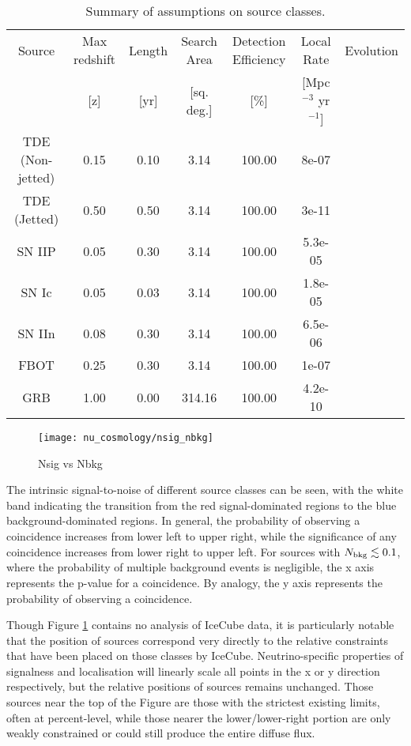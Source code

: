 \begin{table*}[]
	\centering
	\begin{tabular}{||c c c c c c c|} 
	\hline
	Source & Max redshift & Length & Search Area & Detection Efficiency & Local Rate & Evolution \\
	& [z] & [yr] & [sq. deg.] & [\%] & [Mpc$^{-3}$ yr$^{-1}$] & \\
	\hline
	TDE (Non-jetted) & 0.15 & 0.10 & 3.14 & 100.00 & 8e-07 & \\
	TDE (Jetted) & 0.50 & 0.50 & 3.14 & 100.00 & 3e-11 & \\
	SN IIP & 0.05 & 0.30 & 3.14 & 100.00 & 5.3e-05 & \\
	SN Ic & 0.05 & 0.03 & 3.14 & 100.00 & 1.8e-05 & \\
	SN IIn & 0.08 & 0.30 & 3.14 & 100.00 & 6.5e-06 & \\
	FBOT & 0.25 & 0.30 & 3.14 & 100.00 & 1e-07 & \\
	GRB & 1.00 & 0.00 & 314.16 & 100.00 & 4.2e-10 & \\
	\hline
	\end{tabular}
	\caption{Summary of assumptions on source classes.}
	\label{tab:source_properties}
\end{table*}{}

\begin{figure}[!ht]
	\centering \texttt{[image: nu\_cosmology/nsig\_nbkg]}
	\caption{Nsig vs Nbkg}
	\label{fig:nsig_nbkg}
\end{figure}

The intrinsic signal-to-noise of different source classes can be seen, with the white band indicating the transition from the red signal-dominated regions to the blue background-dominated regions. In general, the probability of observing a coincidence increases from lower left to upper right, while the significance of any coincidence increases from lower right to upper left. For sources with $N_{\textup{bkg}} \lesssim 0.1$, where the probability of multiple background events is negligible, the x axis represents the p-value for a coincidence. By analogy, the y axis represents the probability of observing a coincidence.

Though Figure \ref{fig:nsig_nbkg} contains no analysis of IceCube data, it is particularly notable that the position of sources correspond very directly to the relative constraints that have been placed on those classes by IceCube. Neutrino-specific properties of signalness and localisation will linearly scale all points in the x or y direction respectively, but the relative positions of sources remains unchanged. Those sources near the top of the Figure are those with the strictest existing limits, often at percent-level, while those nearer the lower/lower-right portion are only weakly constrained or could still produce the entire diffuse flux. 

